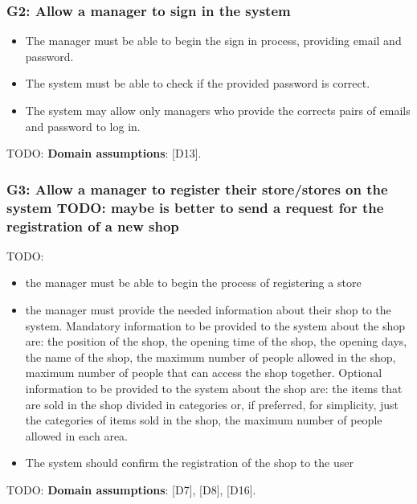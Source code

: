 \subsubsection{G2: Allow a manager to sign in the system}
\label{subsubsect:G2}

\begin{itemize}[topsep=0pt]
    \item The manager must be able to begin the sign in process, providing email and password.
    \item The system must be able to check if the provided password is correct.
    \item The system may allow only managers who provide the corrects pairs of emails and password to log in.
\end{itemize}

TODO: \textbf{Domain assumptions}: [D13].

\subsubsection{G3: Allow a manager to register their store/stores on the system TODO: maybe is better to send a request for the registration of a new shop}
\label{subsubsect:G3}

TODO:
\begin{itemize}[topsep=0pt]
    \item the manager must be able to begin the process of registering a store 
    \item the manager must provide the needed information about their shop to the system.\newline
    Mandatory information to be provided to the system about the shop are: \newline
    the position of the shop,
    the opening time of the shop,
    the opening days, 
    the name of the shop,
    the maximum number of people allowed in the shop,
    maximum number of people that can access the shop together.
    Optional information to be provided to the system about the shop are:
    the items that are sold in the shop divided in categories or, if preferred, for simplicity, just the categories of items sold in the shop,
    the maximum number of people allowed in each area.
    \item The system should confirm the registration of the shop to the user
\end{itemize}

TODO: \textbf{Domain assumptions}: [D7], [D8], [D16].

